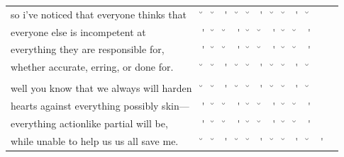 \documentclass[12pt, landscape]{article}
\begin{document}
\begin{center}
\begin{tabularx}{\textwidth}{
>{\lefting\arraybackslash}X
c
c
c
c
c
c
c
c
c
c
c
c
}

so i've noticed that everyone thinks that & \u{} & \u{} & \'{} & \u{} & \u{} & \'{} & \u{} & \u{} & \'{} & \u{} & \\
everyone else is incompetent at & \'{} & \u{} & \u{} & \'{} & \u{} & \u{} & \'{} & \u{} & \u{} & \'{} & \\
everything they are responsible for, & \'{} & \u{} & \u{} & \'{} & \u{} & \u{} & \'{} & \u{} & \u{} & \'{} & \\
whether accurate, erring, or done for. & \u{} & \u{} & \'{} & \u{} & \u{} & \'{} & \u{} & \u{} & \'{} & \u{} & \\
 & & & & & & & & \\
well you know that we always will harden & \u{} & \u{} & \'{} & \u{} & \u{} & \'{} & \u{} & \u{} & \'{} & \u{} & \\
hearts against everything possibly skin--- & \'{} & \u{} & \u{} & \'{} & \u{} & \u{} & \'{} & \u{} & \u{} & \'{} & \\
everything actionlike partial will be, & \'{} & \u{} & \u{} & \'{} & \u{} & \u{} & \'{} & \u{} & \u{} & \'{} & \\
while unable to help us us all save me. & \u{} & \u{} & \'{} & \u{} & \u{} & \'{} & \u{} & \u{} & \'{} & \u{} & \'{} \\

\end{tabularx}
\end{center}

\vspace*{\fill}
\end{document}

